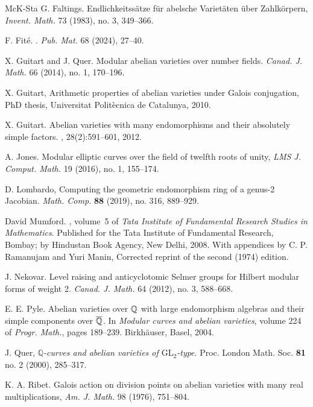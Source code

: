 \documentclass[oneside]{amsart}
\theoremstyle{remark}
\newcommand{\Q}{\mathbb Q}
\newcommand{\GL}{\mathrm{GL}}
\numberwithin{equation}{section}
\begin{document}
\begin{thebibliography}{McK-Sta}
 G. Faltings.
\newblock Endlichkeitssätze für abelsche Varietäten über Zahlkörpern,
\newblock \emph{Invent. Math.} 73 (1983), no. 3, 349--366.

 F. Fit\'e. 
. 
\newblock \emph{Pub. Mat.} 68 (2024), 27--40.


 X. Guitart and J. Quer. Modular abelian varieties over number fields. \emph{Canad. J. Math.} 66 (2014), no. 1, 170--196.


 X. Guitart, 
\newblock Arithmetic properties of abelian varieties under Galois conjugation, PhD thesis, Universitat Politècnica de Catalunya, 2010.

X. Guitart.
\newblock Abelian varieties with many endomorphisms and their absolutely simple
  factors.
, 28(2):591--601, 2012.

 A. Jones. Modular elliptic curves over the field of twelfth roots of unity, \emph{LMS J. Comput. Math.} 19 (2016), no. 1, 155--174.

 D. Lombardo, Computing the geometric endomorphism ring of a genus-2 Jacobian. \emph{Math. Comp.} {\bf 88} (2019), no. 316, 889--929.
  
David Mumford.
, volume~5 of {\em Tata Institute of
  Fundamental Research Studies in Mathematics}.
\newblock Published for the Tata Institute of Fundamental Research, Bombay; by
  Hindustan Book Agency, New Delhi, 2008.
\newblock With appendices by C. P. Ramanujam and Yuri Manin, Corrected reprint
  of the second (1974) edition.

 J. Nekovar.
Level raising and anticyclotomic Selmer groups for Hilbert modular forms of weight 2.
\emph{Canad. J. Math.}   64 (2012), no. 3, 588--668.

E. E. Pyle.
\newblock Abelian varieties over {$\Bbb Q$} with large endomorphism algebras
  and their simple components over {$\overline{\Bbb Q}$}.
\newblock In {\em Modular curves and abelian varieties}, volume 224 of {\em  Progr. Math.}, pages 189--239. Birkh\"{a}user, Basel, 2004.

 J. Quer, {\it $\Q$-curves and abelian varieties of $\GL_2$-type}. Proc. London Math. Soc. {\bf 81} no. 2 (2000), 285--317.

K. A. Ribet. 
\newblock Galois action on division points on abelian varieties with many real multiplications, 
{\em Am. J. Math.} 98 (1976), 751--804.


\end{thebibliography}
\end{document}
